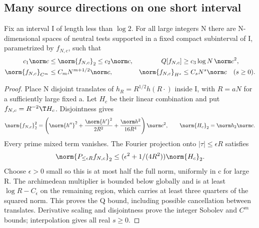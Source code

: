 \subsection{Many source directions on one short interval}
\begin{lemma}\label{lem:many-tests}
Fix an interval I of length less than $\log2$. For all large integers
N there are N-dimensional spaces of neutral tests supported in a
fixed compact subinterval of I, parametrized by $f_{N,c}$, such that
\begin{align}
c_1\norm c&\le\norm{f_{N,c}}_2\le c_2\norm c,
&Q[f_{N,c}]&\ge c_3\log N\,\norm c^2,\label{eq:many-tests}\\
\norm{f_{N,c}}_{C^m}&\le C_mN^{m+1/2}\norm c,
&\norm{f_{N,c}}_{H^s}&\le C_sN^s\norm c\quad(s\ge0).
\end{align}
\end{lemma}
\begin{proof}
Place N disjoint translates of $h_R=R^{1/2}h(R\cdot)$ inside I,
with $R=aN$ for a sufficiently large fixed a. Let $H_c$ be their
linear combination and put $f_{N,c}=R^{-2}\T H_c$. Disjointness gives
\begin{equation}
\norm{f_{N,c}}_2^2=
\left(\norm{h''}^2+\frac{\norm{h'}^2}{2R^2}
+\frac{\norm h^2}{16R^4}\right)\norm c^2,
\qquad \norm{H_c}_2=\norm h_2\norm c.
\end{equation}
Every prime mixed term vanishes. The Fourier projection onto
$|\tau|\le\epsilon R$ satisfies
\begin{equation}\label{eq:many-low-frequency}
\norm{P_{\le\epsilon R}f_{N,c}}_2
\le(\epsilon^2+1/(4R^2))\norm{H_c}_2.
\end{equation}
Choose $\epsilon>0$ small so this is at most half the full norm,
uniformly in c for large R. The archimedean multiplier is bounded
below globally and is at least $\log R-C_\epsilon$ on the remaining
region, which carries at least three quarters of the squared norm.
This proves the Q bound, including possible cancellation between
translates. Derivative scaling and disjointness prove the integer
Sobolev and $C^m$ bounds; interpolation gives all real $s\ge0$.
\end{proof}

